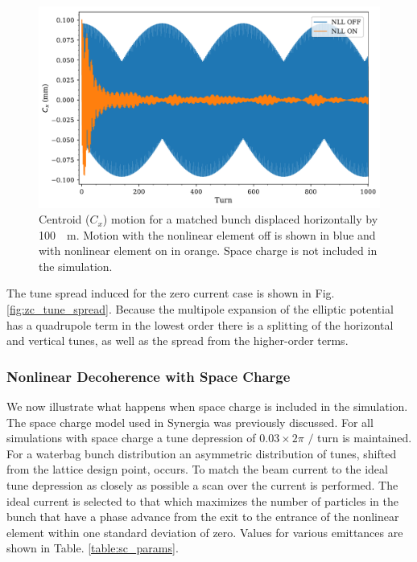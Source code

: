 \documentclass[aps,prstab,twocolumn, groupedaddress]{revtex4-1}
\begin{document}
\begin{figure}
	\includegraphics[width=\columnwidth]{t_on-off_8um.pdf}%
	\caption{\label{fig:nll_on-off} Centroid ($C_x$) motion for a matched bunch displaced 
	horizontally by \SI{100}{\mu m}. Motion with the nonlinear element off is shown in blue 
	and with nonlinear element on in orange. Space charge is not included in the 
	simulation.}
\end{figure}

The tune spread induced for the zero current case is shown in Fig. 
\ref{fig:zc_tune_spread}. Because the multipole expansion of the elliptic potential has a 
quadrupole term in the lowest order there is a splitting of the horizontal and vertical 
tunes, as well as the spread from the higher-order terms. 

\subsubsection{Nonlinear Decoherence with Space Charge}

We now illustrate what happens when space charge is included in the simulation. The 
space charge model used in Synergia was previously discussed. For all simulations with 
space charge a tune depression of $0.03 \times 2\pi$ $/$ turn is maintained. For a 
waterbag bunch distribution an asymmetric distribution of tunes, shifted from the lattice 
design point, occurs. To match the beam current to the ideal tune depression as closely 
as possible a scan over the current is performed. The ideal current is selected to that 
which maximizes the number of particles in the bunch that have a phase advance from the 
exit to the entrance of the nonlinear element within one standard deviation of zero. Values 
for various emittances are shown in Table. \ref{table:sc_params}.
\end{document}
